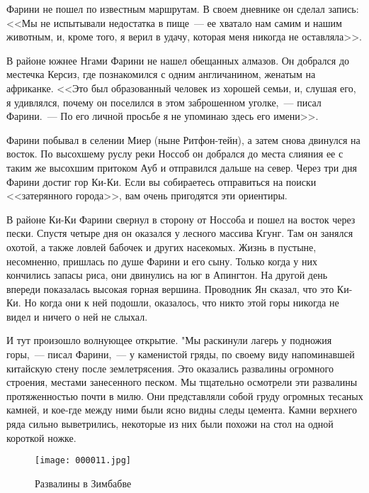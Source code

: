 \documentclass[12pt,a4paper,twoside,openany,svgnames]{memoir}
\begin{document}
Фарини не пошел по известным маршрутам. В своем дневнике он сделал запись: <<Мы не испытывали недостатка в пище~--- ее хватало нам самим и нашим животным, и, кроме того, я верил в удачу, которая меня никогда не оставляла>>.

В районе южнее Нгами Фарини не нашел обещанных алмазов. Он добрался до местечка Керсиз, где познакомился с одним англичанином, женатым на африканке. <<Это был образованный человек из хорошей семьи, и, слушая его, я удивлялся, почему он поселился в этом заброшенном уголке,~--- писал Фарини.~--- По его личной просьбе я не упоминаю здесь его имени>>.

Фарини побывал в селении Миер (ныне Ритфон-тейн), а затем снова двинулся на восток. По высохшему руслу реки Носсоб он добрался до места слияния ее с таким же высохшим притоком Ауб и отправился дальше на север. Через три дня Фарини достиг гор Ки-Ки. Если вы собираетесь отправиться на поиски <<затерянного города>>, вам очень пригодятся эти ориентиры.

В районе Ки-Ки Фарини свернул в сторону от Носсоба и пошел на восток через пески. Спустя четыре дня он оказался у лесного массива Кгунг. Там он занялся охотой, а также ловлей бабочек и других насекомых. Жизнь в пустыне, несомненно, пришлась по душе Фарини и его сыну. Только когда у них кончились запасы риса, они двинулись на юг в Апингтон. На другой день впереди показалась высокая горная вершина. Проводник Ян сказал, что это Ки-Ки. Но когда они к ней подошли, оказалось, что никто этой горы никогда не видел и ничего о ней не слыхал.

И тут произошло волнующее открытие. "Мы раскинули лагерь у подножия горы,~--- писал Фарини,~--- у каменистой гряды, по своему виду напоминавшей китайскую стену после землетрясения. Это оказались развалины огромного строения, местами занесенного песком. Мы тщательно осмотрели эти развалины протяженностью почти в милю. Они представляли собой груду огромных тесаных камней, и кое-где между ними были ясно видны следы цемента. Камни верхнего ряда сильно выветрились, некоторые из них были похожи на стол на одной короткой ножке.

\begin{figure}[ht!]
\centering
\texttt{[image: 000011.jpg]}
\caption{Развалины в Зимбабве}
\label{overflow}
\end{figure}
\end{document}
